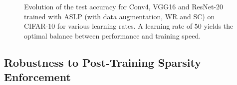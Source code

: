 \begin{figure}[htbp]
  \centering
  \caption{Evolution of the test accuracy for Conv4, VGG16 and ResNet-20 trained
    with \ac{ASLP} (with data augmentation, \ac{WR} and \ac{SC}) on CIFAR-10 for various learning
    rates. A learning rate of 50 yields the optimal balance between performance
    and training speed.}
  \label{fig:chap2:lr_impact}
\end{figure}

\subsection{Robustness to Post-Training Sparsity Enforcement}
\label{sec:chap2:increasing_sparsity}

